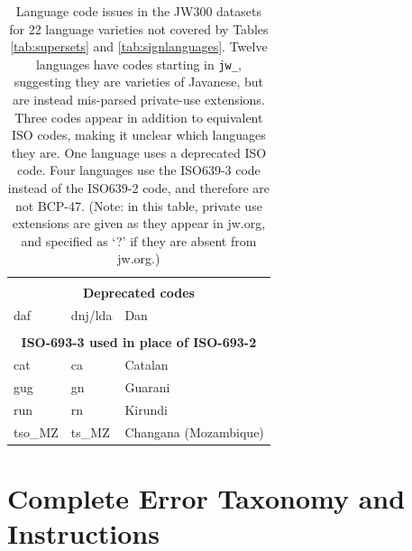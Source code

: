 \begin{table}[th]
\begin{tabular}{lll}
        \multicolumn{3}{c}{}                                                          \\
        \multicolumn{3}{c}{\textbf{Deprecated codes}}                                 \\
        \hdashline
        daf                    & dnj/lda              & Dan                           \\

        \multicolumn{3}{c}{}                                                          \\
        \multicolumn{3}{c}{\textbf{ISO-693-3 used in place of ISO-693-2}}             \\
        \hdashline
        cat                    & ca                   & Catalan                       \\
        gug                    & gn                   & Guarani                       \\
        run                    & rn                   & Kirundi                       \\
        tso\_MZ                & ts\_MZ               & Changana (Mozambique)         \\
        \bottomrule
    \end{tabular}
    \caption{Language code issues in the JW300 datasets for 22 language varieties not covered by Tables \ref{tab:supersets} and \ref{tab:signlanguages}. Twelve languages have codes starting in \texttt{jw\_}, suggesting they are varieties of Javanese, but are instead mis-parsed private-use extensions. Three codes appear in addition to equivalent ISO codes, making it unclear which languages they are. One language uses a deprecated ISO code. Four languages use the ISO639-3 code instead of the ISO639-2 code, and therefore are not BCP-47. (Note: in this table, private use extensions are given as they appear in jw.org, and specified as `?' if they are absent from jw.org.)}
    \label{tab:jw300nonbcp}
\end{table}



\section{Complete Error Taxonomy and Instructions}

